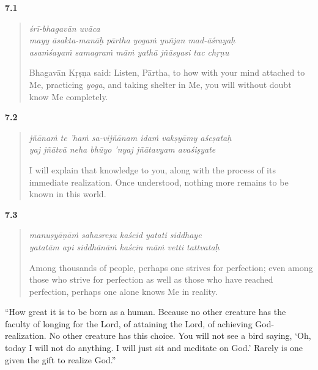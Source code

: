 \par\noindent\textbf{7.1}\par
\begin{verse}
\textit{śrī-bhagavān uvāca} \\
\textit{mayy āsakta-manāḥ pārtha yogaṁ yuñjan mad-āśrayaḥ} \\
\textit{asaṁśayaṁ samagraṁ māṁ yathā jñāsyasi tac chṛṇu}

\noindent Bhagavān Kṛṣṇa said: Listen, Pārtha, to how with your mind attached to Me, practicing \textit{yoga}, and taking shelter in Me, you will without doubt know Me completely.
\end{verse}
\par



\par\noindent\textbf{7.2}\par
\begin{verse}
\textit{jñānaṁ te ’haṁ sa-vijñānam idaṁ vakṣyāmy aśeṣataḥ} \\
\textit{yaj jñātvā neha bhūyo ’nyaj jñātavyam avaśiṣyate}

\noindent I will explain that knowledge to you, along with the process of its immediate realization. Once understood, nothing more remains to be known in this world.
\end{verse}
\par



\par\noindent\textbf{7.3}\par
\begin{verse}
\textit{manuṣyāṇāṁ sahasreṣu kaścid yatati siddhaye} \\
\textit{yatatām api siddhānāṁ kaścin māṁ vetti tattvataḥ}

\noindent Among thousands of people, perhaps one strives for perfection; even among those who strive for perfection as well as those who have reached perfection, perhaps one alone knows Me in reality.
\end{verse}
\par


\enquote{How great it is to be born as a human. Because no other creature has the faculty of longing for the Lord, of attaining the Lord, of achieving God-realization. No other creature has this choice. You will not see a bird saying, \enquote{Oh, today I will not do anything. I will just sit and meditate on God.} Rarely is one given the gift to realize God.}

